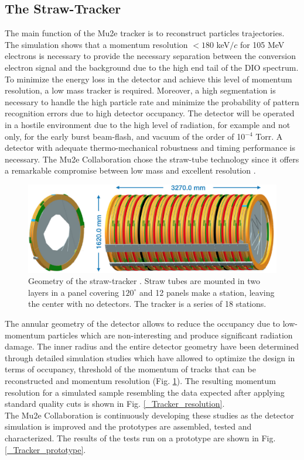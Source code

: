 \documentclass[12pt,a4paper,openright, oneside, titlepage]{book} %
\begin{document}
\subsection{The Straw-Tracker}
The main function of the Mu2e tracker is to reconstruct particles trajectories. 
The simulation shows that a momentum resolution $<180$ keV$/c$ for 105 MeV electrons is necessary to provide the necessary separation between the conversion electron signal and the background due to the high end tail of the DIO spectrum. 
To minimize the energy loss in the detector and achieve this level of momentum resolution, a low mass tracker is required. 
Moreover, a high segmentation is necessary to handle the high particle rate and minimize the probability of pattern recognition errors due to high detector occupancy.
The detector will be operated in a hostile environment due to the high level of radiation, for example and not only, for the early burst beam-flash, and vacuum of the order of 10$^{-4}$ Torr.
A detector with adequate thermo-mechanical robustness and timing performance is necessary.
The Mu2e Collaboration chose the straw-tube technology since it offers a remarkable compromise between low mass and excellent resolution \cite{Tracker:2016} \cite{Tracker:2018}.

\begin{figure}[h!]
\centering
\includegraphics[scale=0.5]{Tracker_2}
\caption[Straw-tube tracker]{Geometry of the straw-tracker \cite{Manolis}. 
Straw tubes are mounted in two layers in a panel covering $120^\circ$ and 12 panels make a station, leaving the center with no detectors. The tracker is a series of 18 stations.}
\label{_tracker}
\end{figure}

\noindent
The annular geometry of the detector allows to reduce the occupancy due to low-momentum particles which are non-interesting and produce significant radiation damage.
The inner radius and the entire detector geometry have been determined through detailed simulation studies which have allowed to optimize the design in terms of occupancy, threshold of the momentum of tracks that can be reconstructed and momentum resolution (Fig. \ref{_tracker}).
The resulting momentum resolution for a simulated sample resembling the data expected after applying standard quality cuts is shown in Fig. \ref{_Tracker_resolution}.\\
The Mu2e Collaboration is continuously developing these studies as the detector simulation is improved and the prototypes are assembled, tested and characterized. The results of the tests run on a prototype are shown in Fig. \ref{_Tracker_prototype}.
\end{document}
